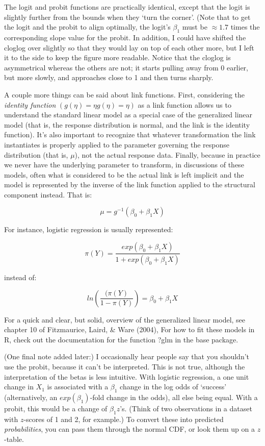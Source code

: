 \documentclass[
]{book}
\begin{document}
The logit and probit functions are practically identical,
except that the logit is slightly further from the bounds when they `turn the corner'.
(Note that to get the logit and the probit to align optimally,
the logit's \(β_1\) must be \(≈1.7\) times the corresponding slope value for the probit.
In addition, I could have shifted the cloglog over slightly
so that they would lay on top of each other more,
but I left it to the side to keep the figure more readable.
Notice that the cloglog is asymmetrical whereas the others are not;
it starts pulling away from 0 earlier, but more slowly,
and approaches close to 1 and then turns sharply.

A couple more things can be said about link functions.
First, considering the \emph{identity function} \((g(η)=ηg(\eta)=\eta)\)
as a link function allows us to understand the standard linear model
as a special case of the generalized linear model
(that is, the response distribution is normal, and the link is the identity function).
It's also important to recognize that whatever transformation the link instantiates
is properly applied to the parameter governing the response distribution (that is, \(μ\)),
not the actual response data.
Finally, because in practice we never have the underlying parameter to transform,
in discussions of these models,
often what is considered to be the actual link is left implicit and
the model is represented by the inverse of the link function
applied to the structural component instead.
That is:

\[μ=g^{−1}(β_0+β_1 X)\]

For instance, logistic regression is usually represented:

\[π(Y)=\frac{exp(β_0 + β_1 X)}{1+exp(β_0 + β_1 X)}\]

instead of:

\[ln(\frac{(π(Y)}{1−π(Y)}) = β_0 + β_1 X\]

For a quick and clear, but solid, overview of the generalized linear model,
see chapter 10 of Fitzmaurice, Laird, \& Ware (2004),
For how to fit these models in R, check out the documentation for the function ?glm in the base package.

(One final note added later:) I occasionally hear people say that
you shouldn't use the probit, because it can't be interpreted.
This is not true, although the interpretation of the betas is less intuitive.
With logistic regression, a one unit change in \(X_1\) is associated with
a \(β_1\) change in the log odds of `success'
(alternatively, an \(exp(β_1)\)-fold change in the odds), all else being equal.
With a probit, this would be a change of \(β_1 z\)'s.
(Think of two observations in a dataset with \(z\)-scores of 1 and 2, for example.)
To convert these into predicted \emph{probabilities},
you can pass them through the normal CDF, or look them up on a \(z\)-table.
\end{document}
